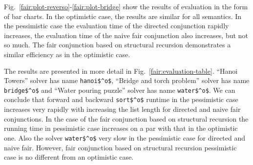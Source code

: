 Fig.~\ref{fair:plot-reverso}-\ref{fair:plot-bridge} show the results of evaluation in the form of bar charts. In the optimistic case, the results are similar for all semantics.
In the pessimistic case the evaluation time of the directed conjunction rapidly increases, the evaluation time of the naive fair conjunction also increases, but not so much.
The fair conjunction based on structural recursion demonstrates a similar efficiency as in the optimistic case.

The results are presented in more detail in Fig.~\ref{fair:evaluation-table}. ``Hanoi Towers'' solver has name \lstinline{hanoi$^o$}, ``Bridge and torch problem'' solver has name \lstinline{bridge$^o$} and ``Water pouring puzzle'' solver has name \lstinline{water$^o$}. We can conclude that forward and backward \lstinline{sort$^o$} runtime in the pessimistic case increases very rapidly with increasing the list length for directed and naive fair conjunctions. In the case of the fair conjunction based on structural recursion the running time in pessimistic case increases on a par with that in the optimistic one. Also  the solver \lstinline{water$^o$} very slow in the pessimistic case for directed and naive fair. However, fair conjunction based on structural recursion pessimistic case is no different from an optimistic case.

